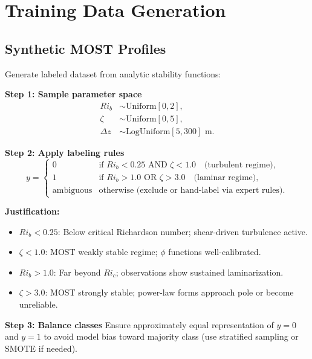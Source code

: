 \documentclass[11pt]{article}
\begin{document}
\section{Training Data Generation}

\subsection{Synthetic MOST Profiles}

Generate labeled dataset from analytic stability functions:

\textbf{Step 1: Sample parameter space}
\begin{align}
Ri_b &\sim \text{Uniform}[0, 2], \label{eq:Ri_b_range} \\
\zeta &\sim \text{Uniform}[0, 5], \label{eq:zeta_range} \\
\Delta z &\sim \text{LogUniform}[5, 300] \text{ m}. \label{eq:Delta_z_range}
\end{align}

\textbf{Step 2: Apply labeling rules}
\begin{equation}
y = 
\begin{cases}
0 & \text{if } Ri_b < 0.25 \text{ AND } \zeta < 1.0 \quad \text{(turbulent regime)}, \\
1 & \text{if } Ri_b > 1.0 \text{ OR } \zeta > 3.0 \quad \text{(laminar regime)}, \\
\text{ambiguous} & \text{otherwise (exclude or hand-label via expert rules)}.
\end{cases}
\label{eq:labeling_rules}
\end{equation}

\textbf{Justification:}
\begin{itemize}[leftmargin=*]
\item $Ri_b < 0.25$: Below critical Richardson number; shear-driven turbulence active.
\item $\zeta < 1.0$: MOST weakly stable regime; $\phi$ functions well-calibrated.
\item $Ri_b > 1.0$: Far beyond $Ri_c$; observations show sustained laminarization.
\item $\zeta > 3.0$: MOST strongly stable; power-law forms approach pole or become unreliable.
\end{itemize}

\textbf{Step 3: Balance classes}
Ensure approximately equal representation of $y=0$ and $y=1$ to avoid model bias toward majority class (use stratified sampling or SMOTE if needed).
\end{document}
